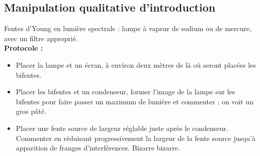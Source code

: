 \documentclass[11pt,a4paper]{report}
\begin{document}
\subsection*{Manipulation qualitative d'introduction}

Fentes d'Young en lumière spectrale : lampe à vapeur de sodium ou de mercure, avec un filtre approprié.\\

\textbf{Protocole :}
\begin{itemize}
	\item Placer la lampe et un écran, à environ deux mètres de là où seront placées les bifentes.
	\item Placer les bifentes et un condenseur, former l'image de la lampe sur les bifentes pour faire passer un maximum de lumière et commenter : on voit un gros pâté.
	\item Placer une fente source de largeur réglable juste après le condenseur. Commenter en réduisant progressivement la largeur de la fente source jusqu'à apparition de franges d'interférences. Bizarre bizarre.
\end{itemize}
\end{document}
